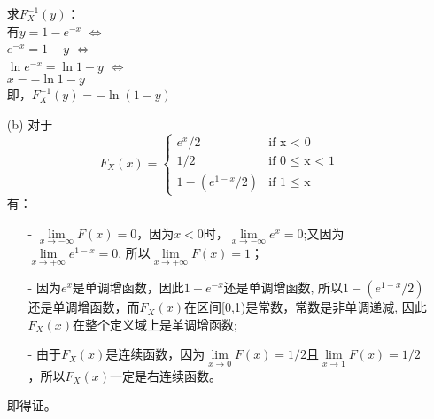 \documentclass [12pt]{article}
\begin{document}
\begin{CJK*}{GBK}{kai}
\begin{enumerate}
求$F_{X}^{-1}(y)$：\\
有$y=1-e^{-x} $
 $\Leftrightarrow$\\
 $e^{-x}=1-y $
 $\Leftrightarrow$\\
 $\ln{e^{-x}}=\ln{1-y} $
$\Leftrightarrow$\\
 $x=- \ln{1-y} $\\
 即，$F_{X}^{-1}(y)=- \ln{(1-y)}$\\
 
 
  \item[(b)]  对于
$$F_{X}(x)=
\begin{cases}
e^x / 2 & \text{if x < 0}\\
1 / 2 & \text{if 0 $\le$ x < 1}\\
1- (e^{1-x} / 2) & \text{if 1 $\le$ x}
\end{cases}$$
有：
\begin{itemize}
\item[-] $\lim\limits_{x \to -\infty }F(x) = 0$，因为$x<0$时，$\lim\limits_{x \to -\infty }e^x = 0$;又因为$\lim\limits_{x \to +\infty }e^{1-x} = 0$, 所以$\lim\limits_{x \to +\infty }F(x) = 1$；
\item[-] 因为$e^x$是单调增函数，因此$1 - e^{-x}$还是单调增函数, 所以$1- (e^{1-x} / 2)$还是单调增函数，而$F_{X}(x)$在区间[0,1)是常数，常数是非单调递减,  因此$F_{X}(x)$在整个定义域上是单调增函数;
\item[-] 由于$F_{X}(x)$是连续函数，因为$\lim\limits_{x \to 0 }F(x) = 1/2$且$\lim\limits_{x \to 1 }F(x) = 1/2$，所以$F_{X}(x)$一定是右连续函数。
\end{itemize}
即得证。


\end{enumerate}
\end{CJK*}
\end{document}
